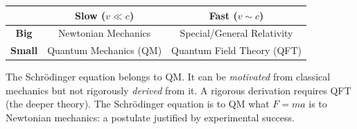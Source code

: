\documentclass[11pt,a4paper]{article}
\theoremstyle{definition}
\theoremstyle{plain}
\theoremstyle{remark}
\begin{document}
\begin{center}
\renewcommand{\arraystretch}{1.4}
\begin{tabular}{c|c|c}
     & \textbf{Slow} ($v \ll c$) & \textbf{Fast} ($v \sim c$) \\ \hline
    \textbf{Big} & Newtonian Mechanics & Special/General Relativity \\
    \textbf{Small} & Quantum Mechanics (QM) & Quantum Field Theory (QFT)
\end{tabular}
\end{center}

The Schr\"odinger equation belongs to QM. It can be \emph{motivated} from classical mechanics but not rigorously \emph{derived} from it. A rigorous derivation requires QFT (the deeper theory). The Schr\"odinger equation is to QM what $F = ma$ is to Newtonian mechanics: a postulate justified by experimental success.
\end{document}
